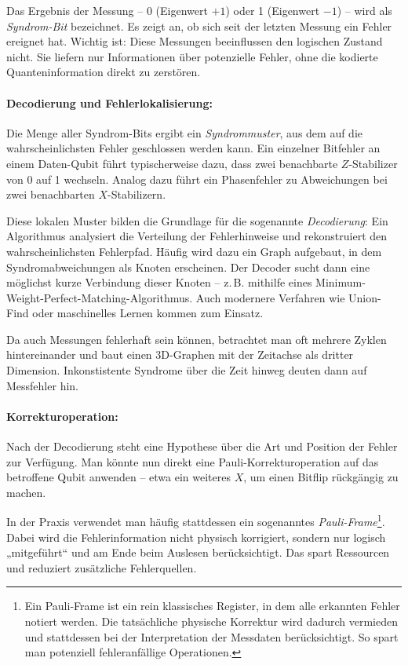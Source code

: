 Das Ergebnis der Messung – 0 (Eigenwert \(+1\)) oder 1 (Eigenwert \(-1\)) – wird als \emph{Syndrom-Bit} bezeichnet. Es zeigt an, ob sich seit der letzten Messung ein Fehler ereignet hat. Wichtig ist: Diese Messungen beeinflussen den logischen Zustand nicht. Sie liefern nur Informationen über potenzielle Fehler, ohne die kodierte Quanteninformation direkt zu zerstören.

\paragraph{Decodierung und Fehlerlokalisierung:}

Die Menge aller Syndrom-Bits ergibt ein \emph{Syndrommuster}, aus dem auf die wahrscheinlichsten Fehler geschlossen werden kann. Ein einzelner Bitfehler an einem Daten-Qubit führt typischerweise dazu, dass zwei benachbarte \(Z\)-Stabilizer von 0 auf 1 wechseln. Analog dazu führt ein Phasenfehler zu Abweichungen bei zwei benachbarten \(X\)-Stabilizern.

Diese lokalen Muster bilden die Grundlage für die sogenannte \emph{Decodierung}: Ein Algorithmus analysiert die Verteilung der Fehlerhinweise und rekonstruiert den wahrscheinlichsten Fehlerpfad. Häufig wird dazu ein Graph aufgebaut, in dem Syndromabweichungen als Knoten erscheinen. Der Decoder sucht dann eine möglichst kurze Verbindung dieser Knoten – z.\,B. mithilfe eines Minimum-Weight-Perfect-Matching-Algorithmus. Auch modernere Verfahren wie Union-Find oder maschinelles Lernen kommen zum Einsatz.

Da auch Messungen fehlerhaft sein können, betrachtet man oft mehrere Zyklen hintereinander und baut einen 3D-Graphen mit der Zeitachse als dritter Dimension. Inkonstistente Syndrome über die Zeit hinweg deuten dann auf Messfehler hin.

\paragraph{Korrekturoperation:}

Nach der Decodierung steht eine Hypothese über die Art und Position der Fehler zur Verfügung. Man könnte nun direkt eine Pauli-Korrekturoperation auf das betroffene Qubit anwenden – etwa ein weiteres \(X\), um einen Bitflip rückgängig zu machen.

In der Praxis verwendet man häufig stattdessen ein sogenanntes \emph{Pauli-Frame}\footnote{Ein Pauli-Frame ist ein rein klassisches Register, in dem alle erkannten Fehler notiert werden. Die tatsächliche physische Korrektur wird dadurch vermieden und stattdessen bei der Interpretation der Messdaten berücksichtigt. So spart man potenziell fehleranfällige Operationen.}. Dabei wird die Fehlerinformation nicht physisch korrigiert, sondern nur logisch „mitgeführt“ und am Ende beim Auslesen berücksichtigt. Das spart Ressourcen und reduziert zusätzliche Fehlerquellen.

